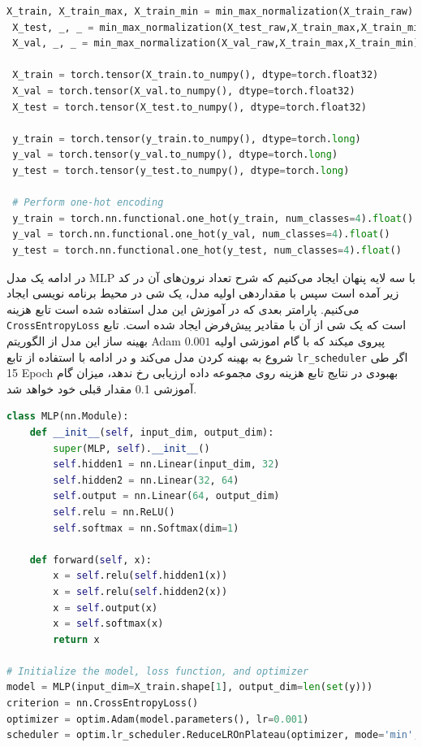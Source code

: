 \documentclass{article}
\begin{document}
\begin{LTR}
	\begin{lstlisting}[language=Python, caption=Normalization and One-hot]
 X_train, X_train_max, X_train_min = min_max_normalization(X_train_raw)
 X_test, _, _ = min_max_normalization(X_test_raw,X_train_max,X_train_min)
 X_val, _, _ = min_max_normalization(X_val_raw,X_train_max,X_train_min)
 
 X_train = torch.tensor(X_train.to_numpy(), dtype=torch.float32)
 X_val = torch.tensor(X_val.to_numpy(), dtype=torch.float32)
 X_test = torch.tensor(X_test.to_numpy(), dtype=torch.float32)
 
 y_train = torch.tensor(y_train.to_numpy(), dtype=torch.long)
 y_val = torch.tensor(y_val.to_numpy(), dtype=torch.long)
 y_test = torch.tensor(y_test.to_numpy(), dtype=torch.long)
 
 # Perform one-hot encoding
 y_train = torch.nn.functional.one_hot(y_train, num_classes=4).float()
 y_val = torch.nn.functional.one_hot(y_val, num_classes=4).float()
 y_test = torch.nn.functional.one_hot(y_test, num_classes=4).float()
	\end{lstlisting}
\end{LTR} 

در ادامه یک مدل MLP با سه لایه پنهان ایجاد می‌کنیم که شرح تعداد نرون‌های آن در کد زیر آمده است سپس با مقدار‌دهی اولیه مدل، یک شی در محیط برنامه نویسی ایجاد می‌کنیم. پارامتر بعدی که در آموزش این مدل استفاده شده است تابع هزینه 
\texttt{CrossEntropyLoss}
است که یک شی از آن با مقادیر پیش‌فرض ایجاد شده است. تابع بهینه ساز این مدل از الگوریتم Adam پیروی میکند که با گام اموزشی اولیه 
$0.001 $
شروع به بهینه کردن مدل می‌کند و در ادامه با استفاده از تابع 
\texttt{lr\_scheduler}
اگر طی 15 
Epoch
 بهبودی در نتایج تابع هزینه روی مجموعه داده ارزیابی رخ ندهد، میزان گام آموزشی 0.1 مقدار قبلی خود خواهد شد. 
\begin{LTR}
	\begin{lstlisting}[language=Python, caption=Model and Configuration]
class MLP(nn.Module):
    def __init__(self, input_dim, output_dim):
        super(MLP, self).__init__()
        self.hidden1 = nn.Linear(input_dim, 32)
        self.hidden2 = nn.Linear(32, 64)
        self.output = nn.Linear(64, output_dim)
        self.relu = nn.ReLU()
        self.softmax = nn.Softmax(dim=1)

    def forward(self, x):
        x = self.relu(self.hidden1(x))
        x = self.relu(self.hidden2(x))
        x = self.output(x)
        x = self.softmax(x)
        return x
        
# Initialize the model, loss function, and optimizer
model = MLP(input_dim=X_train.shape[1], output_dim=len(set(y)))
criterion = nn.CrossEntropyLoss()
optimizer = optim.Adam(model.parameters(), lr=0.001)
scheduler = optim.lr_scheduler.ReduceLROnPlateau(optimizer, mode='min', factor=0.1, patience=15, verbose=True)
	\end{lstlisting}
\end{LTR}         
        
\end{document}
